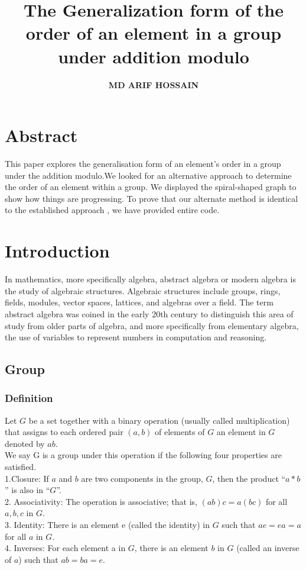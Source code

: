 \documentclass{article}
\author{\textbf{MD ARIF HOSSAIN}}
\title{\textbf {The Generalization form of the order of an element in a group under addition modulo}}
\date{}
\begin{document}
\maketitle{}


\section*{Abstract}

This paper explores the generalisation form of an element's order in a group under the addition modulo.We looked for an alternative approach to determine the order of an element within a group. We displayed the spiral-shaped graph to show how things are progressing. To prove that our alternate method is identical to the established approach , we have provided entire code.
\section{Introduction}

In mathematics, more specifically algebra, abstract algebra or modern algebra is the study of algebraic structures. Algebraic structures include groups, rings, fields, modules, vector spaces, lattices, and algebras over a field. The term abstract algebra was coined in the early 20th century to distinguish this area of study from older parts of algebra, and more specifically from elementary algebra, the use of variables to represent numbers in computation and reasoning.\cite{finston2014abstract}
\subsection{Group}
\subsubsection{Definition}
Let $G$ be a set together with a binary operation (usually called multiplication) that assigns to each ordered pair $(a, b)$ of elements of $G$ an element in $G$ denoted by $ab$.\\ We say G is a group under this operation if the following four properties are satisfied.\\
1.Closure: If $a$ and $b$ are two components in the group, $G$, then the product “$a * b$” is also in “$G$”.\\
2. Associativity: The operation is associative; that is, $(ab)c = a(bc)$ for
all $a, b, c$ in $G$.\\
3. Identity: There is an element e (called the identity) in $G$ such that
$ae = ea = a$ for all $a$ in $G$.\\
4. Inverses: For each element a in $G$, there is an element $b$ in $G$ (called
an inverse of $a$) such that $ab = ba = e$.\cite{gallian2021contemporary}
\end{document}
